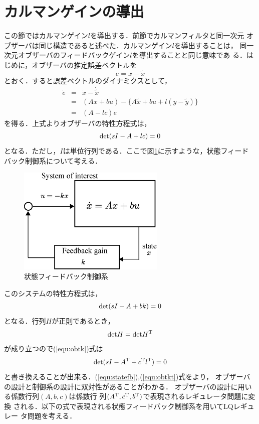 \documentclass[a4paper,12pt]{jarticle}
\begin{document}
\section{カルマンゲインの導出}
この節ではカルマンゲイン$l$を導出する．前節でカルマンフィルタと同一次元
オブザーバは同じ構造であると述べた．カルマンゲイン$l$を導出することは，
同一次元オブザーバのフィードバックゲイン$l$を導出することと同じ意味であ
る．はじめに，オブザーバの推定誤差ベクトルを
\begin{equation}
 e = x - \tilde{x}
\end{equation}
とおく．すると誤差ベクトルのダイナミクスとして，
\begin{eqnarray}
 \dot{e} & = & \dot{x} - \dot{\tilde{x}} \\
 & = & (Ax+bu) - \bigl\{ A\tilde{x} + bu + l(y - \tilde{y} )\bigr\} \\
 & = & (A-lc)e
\end{eqnarray}
を得る．上式よりオブザーバの特性方程式は，
\begin{equation}\label{equ:obtk}
 {\rm{det}} (sI-A+lc)=0
\end{equation}
となる．ただし，$I$は単位行列である．ここで図\ref{fig:state_fb}に示すような，状態フィード
バック制御系について考える．
%
\begin{figure}[tbp]
 \begin{center}
  \includegraphics[width = 70mm]{fig/state_fb.eps}
 \end{center}
 \caption{状態フィードバック制御系}
 \label{fig:state_fb}
\end{figure}
%
このシステムの特性方程式は，
\begin{equation}\label{equ:statefb}
 {\rm{det}} (sI-A+bk)=0
\end{equation}
となる．行列$H$が正則であるとき，
\begin{equation}
 {\rm{det}} H = {\rm{det}} H^{\rm{T}}
\end{equation}
が成り立つので(\ref{equ:obtk})式は
\begin{equation}\label{equ:obtkt}
  {\rm{det}} (sI-A^{\rm{T}}+c^{\rm{T}}l^{\rm{T}})=0
\end{equation}
と書き換えることが出来る．(\ref{equ:statefb}),(\ref{equ:obtkt})式をより，
オブザーバの設計と制御系の設計に双対性があることがわかる．
オブザーバの設計に用いる係数行列$(A,b,c)$は係数行
列$(A^{\rm{T}},c^{\rm{T}},b^{\rm{T}})$で表現されるレギュレータ問題に変換
される．以下の式で表現される状態フィードバック制御系を用いてLQレギュレー
タ問題を考える．
\end{document}
